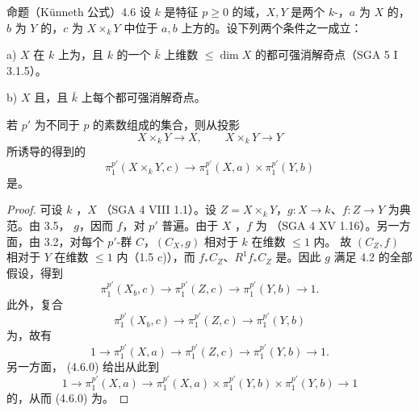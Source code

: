 \begin{SGAresult}{命题（Künneth 公式）}{4.6}
设 $k$ 是特征 $p\geq0$ 的域，$X,Y$ 是两个 $k$-，$a$ 为 $X$ 的，$b$ 为 $Y$ 的，$c$ 为 $X\times_kY$ 中位于 $a,b$ 上方的。设下列两个条件之一成立：

a) $X$ 在 $k$ 上为，且 $k$ 的一个 $\bar k$ 上维数 $\leq\dim X$ 的都可强消解奇点（SGA 5 I 3.1.5）。

b) $X$ 且，且 $\bar k$ 上每个都可强消解奇点。

若 $p'$ 为不同于 $p$ 的素数组成的集合，则从投影
\[X\times_kY\longrightarrow X,\qquad X\times_kY\longrightarrow Y\]
所诱导的得到的
\[\pi_1^{p'}(X\times_kY,c)\longrightarrow\pi_1^{p'}(X,a)\times\pi_1^{p'}(Y,b)\tag{4.6.0}\]
是。
\end{SGAresult}
\begin{proof}
可设 $k$ ，$X$ （SGA 4 VIII 1.1）。设 $Z=X\times_kY$，$g:X\to k$、$f:Z\to Y$ 为典范。由 3.5， $g$，因而 $f$，对 $p'$ 普遍。由于 $X$ ，$f$ 为 （SGA 4 XV 1.16）。另一方面，由 3.2，对每个 $p'$-群 $C$，$(C_X,g)$ 相对于 $k$ 在维数 $\leq1$ 内。
故 $(C_Z,f)$ 相对于 $Y$ 在维数 $\leq1$ 内（1.5 c)），而 $f_*C_Z$、$R^1f_*C_Z$ 是。因此 $g$ 满足 4.2 的全部假设，得到
\[\pi_1^{p'}(X_b,c)\longrightarrow\pi_1^{p'}(Z,c)\longrightarrow\pi_1^{p'}(Y,b)\longrightarrow1.\]
此外，复合
\[\pi_1^{p'}(X_b,c)\longrightarrow\pi_1^{p'}(Z,c)\longrightarrow\pi_1^{p'}(Y,b)\]
为，故有
\[1\longrightarrow\pi_1^{p'}(X,a)\longrightarrow\pi_1^{p'}(Z,c)\longrightarrow\pi_1^{p'}(Y,b)\longrightarrow1.\]
另一方面， (4.6.0) 给出从此到
\[1\longrightarrow\pi_1^{p'}(X,a)\longrightarrow
\pi_1^{p'}(X,a)\times\pi_1^{p'}(Y,b)\times\pi_1^{p'}(Y,b)\longrightarrow1\]
的，从而 (4.6.0) 为。
\end{proof}


